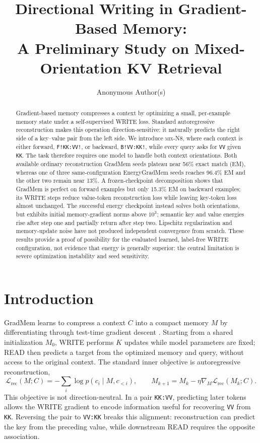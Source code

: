 \documentclass{article}
\title{Directional Writing in Gradient-Based Memory:\\A Preliminary Study on Mixed-Orientation KV Retrieval}
\author{Anonymous Author(s)}
\newcommand{\dataset}{\textsc{mix-N8}}
\newcommand{\egm}{EnergyGradMem}
\newcommand{\gm}{GradMem}
\begin{document}
\maketitle

\begin{abstract}
Gradient-based memory compresses a context by optimizing a small, per-example memory state under a self-supervised WRITE loss.  Standard autoregressive reconstruction makes this operation direction-sensitive: it naturally predicts the right side of a key--value pair from the left side.  We introduce \dataset, where each context is either forward, \texttt{F!KK:VV!}, or backward, \texttt{B!VV:KK!}, while every query asks for \texttt{VV} given \texttt{KK}.  The task therefore requires one model to handle both context orientations.  Both available ordinary reconstruction \gm{} seeds plateau near 56\% exact match (EM), whereas one of three same-configuration \egm{} seeds reaches 96.4\% EM and the other two remain near 13\%.  A frozen-checkpoint decomposition shows that \gm{} is perfect on forward examples but only 15.3\% EM on backward examples; its WRITE steps reduce value-token reconstruction loss while leaving key-token loss almost unchanged.  The successful energy checkpoint instead solves both orientations, but exhibits initial memory-gradient norms above $10^3$; semantic key and value energies rise after step one and partially return after step two.  Lipschitz regularization and memory-update noise have not produced independent convergence from scratch.  These results provide a proof of possibility for the evaluated learned, label-free WRITE configuration, not evidence that energy is generally superior: the central limitation is severe optimization instability and seed sensitivity.
\end{abstract}

\section{Introduction}
\label{sec:introduction}

\gm{} learns to compress a context $C$ into a compact memory $M$ by differentiating through test-time gradient descent \cite{kuratov2026gradmem}.  Starting from a shared initialization $M_0$, WRITE performs $K$ updates while model parameters are fixed; READ then predicts a target from the optimized memory and query, without access to the original context.  The standard inner objective is autoregressive reconstruction,
\begin{equation}
  \mathcal{L}_{\mathrm{rec}}(M;C)
  = -\sum_i \log p(c_i\mid M,c_{<i}),
  \qquad
  M_{k+1}=M_k-\eta\nabla_M\mathcal{L}_{\mathrm{rec}}(M_k;C).
\end{equation}
This objective is not direction-neutral.  In a pair \texttt{KK:VV}, predicting later tokens allows the WRITE gradient to encode information useful for recovering \texttt{VV} from \texttt{KK}.  Reversing the pair to \texttt{VV:KK} breaks this alignment: reconstruction can predict the key from the preceding value, while downstream READ requires the opposite association.
\end{document}
